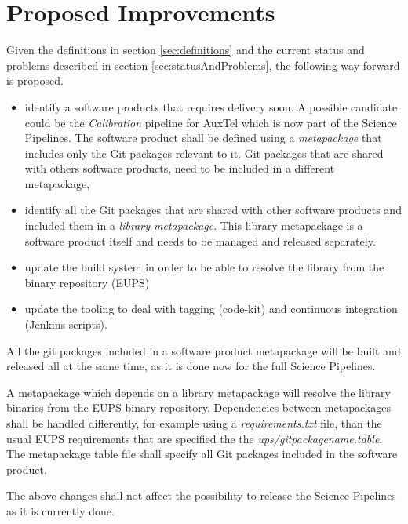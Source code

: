 \newpage
\section{Proposed Improvements}\label{sec:proimp}

Given the definitions in section \ref{sec:definitions} and the current status and problems described in section \ref{sec:statusAndProblems}, the following way forward is proposed.

\begin{itemize}
\item identify a software products that requires delivery soon.
A possible candidate could be the \textit{Calibration} pipeline for AuxTel which is now  part of the Science Pipelines.
The software product shall be defined using a \textit{metapackage} that includes only the Git packages relevant to it.
Git packages that are shared with others software products, need to be included in a different metapackage,
\item identify all the Git packages that are shared with other software products and included them in a \textit{library metapackage}.
This library metapackage is a software product itself and needs to be managed and released separately.
\item update the build system in order to be able to resolve the library from the binary repository (EUPS)
\item update the tooling to deal with tagging (code-kit) and continuous integration (Jenkins scripts).
\end{itemize}

All the git packages included in a software product metapackage will be built and released all at the same time, as it is done now for the full Science Pipelines.

A metapackage which depends on a library metapackage will resolve the library binaries from the EUPS binary repository.
Dependencies between metapackages shall be handled differently, for example using a \textit{requirements.txt} file, than the usual EUPS requirements that are specified the the \textit{ups/gitpackagename.table}.
The metapackage table file shall specify all Git packages included in the  software product.

The above changes shall not affect the possibility to release the Science Pipelines as it is currently done.


